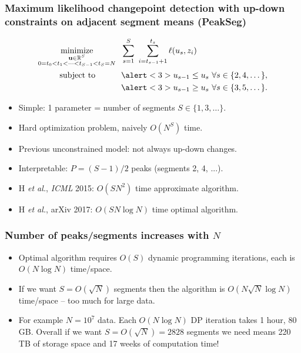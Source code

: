 \documentclass{beamer}
\DeclareMathOperator*{\minimize}{minimize}
\newcommand{\RR}{\mathbb R}
\begin{document}
\begin{frame}
  \frametitle{Maximum likelihood changepoint detection with up-down constraints on adjacent segment means (PeakSeg)}
    
\vskip -1.4cm
\begin{align*}
    \minimize_{\substack{
  \mathbf u\in\RR^{S}
\\
   0=t_0<t_1<\cdots<t_{S-1}<t_S=N
  }} &\ \ 
    \sum_{s=1}^S\  \sum_{i=t_{s-1}+1}^{t_s} \ell( u_s,  z_i) 
  \label{PeakSegPDPA}
\\
      \text{subject to \hskip 0.75cm} &\ \ \alert<3>{u_{s-1} \leq u_s\ \forall s\in\{2,4,\dots\},}
  \nonumber\\
  &\ \ \alert<3>{u_{s-1} \geq u_s\ \forall s\in\{3,5,\dots\}.}
  \nonumber 
\end{align*}
\vskip -0.4cm
\begin{itemize}  
\item Simple: 1 parameter = number of segments $S\in\{1,3,\dots\}$.
\item Hard optimization problem, naively $O(N^S)$ time.
\item \alert<2>{Previous unconstrained model: not always up-down changes.}
\item \alert<3>{Interpretable: $P=(S-1)/2$ peaks (segments 2, 4, ...).}
\item H {\it et al.}, {\it ICML} 2015: $O(SN^2)$ time approximate
  algorithm. 
\item H {\it et al.}, arXiv 2017: $O(SN\log N)$ time optimal algorithm.
\end{itemize}
\end{frame} 

\begin{frame}
  \frametitle{Number of peaks/segments increases with $N$ }
  
  \vskip -0.4cm
  \begin{itemize} 
  \item %
    Optimal algorithm requires $O(S)$ dynamic programming iterations,
    each is $O(N\log N)$ time/space.
  \item If we want $S=O(\sqrt{N})$ segments then the algorithm is
    $O(N \sqrt N \log N)$ time/space -- too much for large data.
  \item For example $N=10^7$ data. Each $O(N\log N)$ DP iteration
    takes 1 hour, 80 GB. Overall if we want $S=O(\sqrt N) = 2828$
    segments we need means 220 TB of storage space and 17 weeks of
    computation time!
  \end{itemize}

  
\end{frame}
\end{document}
